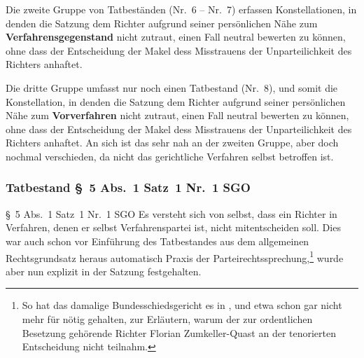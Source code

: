 Die zweite Gruppe von Tatbeständen (Nr.~6 -- Nr.~7) erfassen Konstellationen, in denden die Satzung dem Richter aufgrund seiner persönlichen Nähe zum \textbf{Verfahrensgegenstand} nicht zutraut, einen Fall neutral bewerten zu können, ohne dass der Entscheidung der Makel dess Misstrauens der Unparteilichkeit des Richters anhaftet.

Die dritte Gruppe umfasst nur noch einen Tatbestand (Nr.~8), und somit die Konstellation, in denden die Satzung dem Richter aufgrund seiner persönlichen Nähe zum \textbf{Vorverfahren} nicht zutraut, einen Fall neutral bewerten zu können, ohne dass der Entscheidung der Makel dess Misstrauens der Unparteilichkeit des Richters anhaftet.
An sich ist das sehr nah an der zweiten Gruppe, aber doch nochmal verschieden, da nicht das gerichtliche Verfahren selbst betroffen ist.

\subsubsection{Tatbestand \S~5 Abs.~1 Satz~1 Nr.~1 SGO}
\label{Zusammensetzung:Spruchkoerper:Befangenheitsvermutung:Nr1}
\S~5 Abs.~1 Satz~1 Nr.~1 SGO
Es versteht sich von selbst, dass ein Richter in Verfahren, denen er selbst Verfahrenspartei ist, nicht mitentscheiden soll.
Dies war auch schon vor Einführung des Tatbestandes aus dem allgemeinen Rechtsgrundsatz heraus automatisch Praxis der Parteirechtssprechung,\footnote{So hat das damalige Bundesschiedsgericht es in \cite{BSG3014HS}, \cite{BSG4414HS} und \cite{BSG3215HS} etwa schon gar nicht mehr für nötig gehalten, zur Erläutern, warum der zur ordentlichen Besetzung gehörende Richter Florian Zumkeller-Quast an der tenorierten Entscheidung nicht teilnahm.} wurde aber nun explizit in der Satzung festgehalten.

